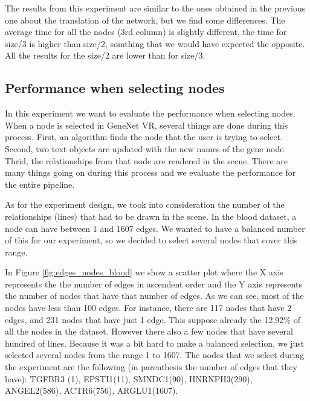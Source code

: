 The results from this experiment are similar to the ones obtained in the previous one about the translation of the network, but we find some differences. The average time for all the nodes (3rd column) is slightly different, the time for size/3 is higher than size/2, somthing that we would have expected the opposite. All the results for the size/2 are lower than for size/3.

\subsection{Performance when selecting nodes}
In this experiment we want to evaluate the performance when selecting nodes. When a node is selected in GeneNet VR, several things are done during this process. First, an algorithm finds the node that the user is trying to select. Second, two text objects are updated with the new names of the gene node. Thrid, the relationships from that node are rendered in the scene. There are many things going on during this process and we evaluate the performance for the entire pipeline.

As for the experiment design, we took into consideration the number of the relationships (lines) that had to be drawn in the scene. In the blood dataset, a node can have between 1 and 1607 edges. We wanted to have a balanced number of this for our experiment, so we decided to select several nodes that cover this range.

In Figure \ref{fig:edges_nodes_blood} we show a scatter plot where the X axis represents the the number of edges in ascendent order and the Y axis represents the number of nodes that have that number of edges. As we can see, most of the nodes have less than 100 edges. For instance, there are 117 nodes that have 2 edges, and 231 nodes that have just 1 edge. This suppose already the 12,92\% of all the nodes in the dataset. However there also a few nodes that have several hundred of lines. Because it was a bit hard to make a balanced selection, we just selected several nodes from the range 1 to 1607. The nodes that we select during the experiment are the following (in parenthesis the number of edges that they have): TGFBR3 (1), EPSTI1(11), SMNDC1(90), HNRNPH3(290), ANGEL2(586), ACTR6(756), ARGLU1(1607).

